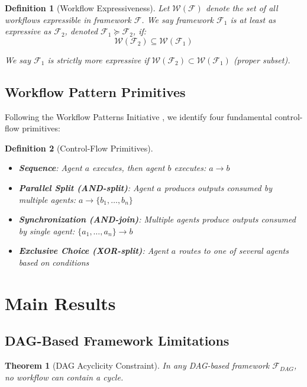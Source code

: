 \documentclass[11pt]{article}
\newtheorem{theorem}{Theorem}
\newtheorem{definition}{Definition}
\begin{document}
\begin{definition}[Workflow Expressiveness]
Let $\mathcal{W}(\mathcal{F})$ denote the set of all workflows expressible in framework $\mathcal{F}$. We say framework $\mathcal{F}_1$ is \emph{at least as expressive as} $\mathcal{F}_2$, denoted $\mathcal{F}_1 \succeq \mathcal{F}_2$, if:
\[\mathcal{W}(\mathcal{F}_2) \subseteq \mathcal{W}(\mathcal{F}_1)\]

We say $\mathcal{F}_1$ is \emph{strictly more expressive} if $\mathcal{W}(\mathcal{F}_2) \subset \mathcal{W}(\mathcal{F}_1)$ (proper subset).
\end{definition}

\subsection{Workflow Pattern Primitives}

Following the Workflow Patterns Initiative \cite{vanderaalst2003workflow}, we identify four fundamental control-flow primitives:

\begin{definition}[Control-Flow Primitives]
\begin{itemize}
    \item \textbf{Sequence}: Agent $a$ executes, then agent $b$ executes: $a \rightarrow b$
    \item \textbf{Parallel Split (AND-split)}: Agent $a$ produces outputs consumed by multiple agents: $a \rightarrow \{b_1, \ldots, b_n\}$
    \item \textbf{Synchronization (AND-join)}: Multiple agents produce outputs consumed by single agent: $\{a_1, \ldots, a_n\} \rightarrow b$
    \item \textbf{Exclusive Choice (XOR-split)}: Agent $a$ routes to one of several agents based on conditions
\end{itemize}
\end{definition}

\section{Main Results}

\subsection{DAG-Based Framework Limitations}

\begin{theorem}[DAG Acyclicity Constraint]
\label{thm:dag-acyclic}
In any DAG-based framework $\mathcal{F}_{DAG}$, no workflow can contain a cycle.
\end{theorem}
\end{document}
